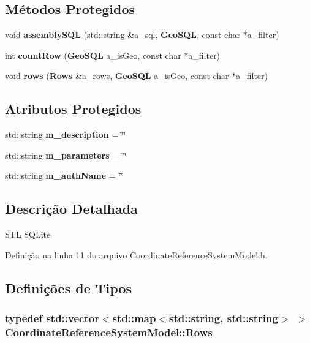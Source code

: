 \subsection*{Métodos Protegidos}
\begin{DoxyCompactItemize}
\item 
void {\bf assembly\+S\+QL} (std\+::string \&a\+\_\+sql, {\bf Geo\+S\+QL}, const char $\ast$a\+\_\+filter)
\item 
int {\bf count\+Row} ({\bf Geo\+S\+QL} a\+\_\+is\+Geo, const char $\ast$a\+\_\+filter)
\item 
void {\bf rows} ({\bf Rows} \&a\+\_\+rows, {\bf Geo\+S\+QL} a\+\_\+is\+Geo, const char $\ast$a\+\_\+filter)
\end{DoxyCompactItemize}
\subsection*{Atributos Protegidos}
\begin{DoxyCompactItemize}
\item 
std\+::string {\bf m\+\_\+description} = \char`\"{}\char`\"{}
\item 
std\+::string {\bf m\+\_\+parameters} = \char`\"{}\char`\"{}
\item 
std\+::string {\bf m\+\_\+auth\+Name} = \char`\"{}\char`\"{}
\end{DoxyCompactItemize}


\subsection{Descrição Detalhada}
S\+TL S\+Q\+Lite 

Definição na linha 11 do arquivo Coordinate\+Reference\+System\+Model.\+h.



\subsection{Definições de Tipos}
\subsubsection[{Rows}]{\setlength{\rightskip}{0pt plus 5cm}typedef std\+::vector$<$std\+::map$<$std\+::string, std\+::string$>$ $>$ {\bf Coordinate\+Reference\+System\+Model\+::\+Rows}}\label{class_coordinate_reference_system_model_a88cbf106a461542e9b804889fe2c4e0b}


